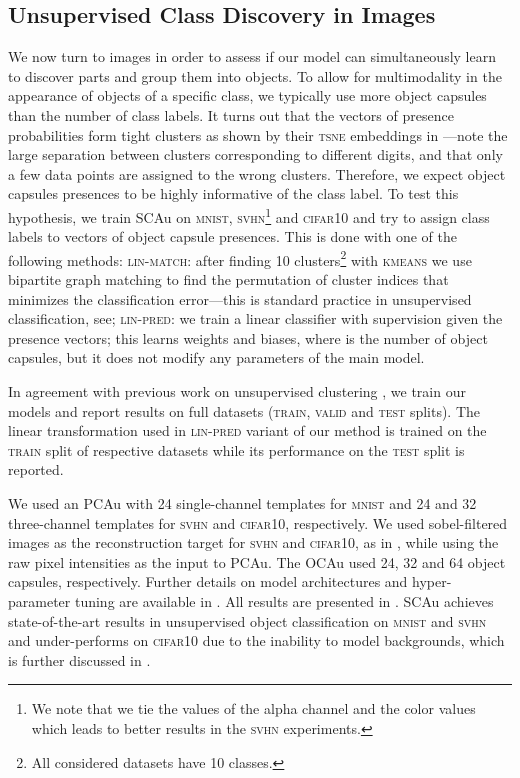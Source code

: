 \documentclass{article}
\begin{document}
\subsection{Unsupervised Class Discovery in Images}
\label{sec:cls_experiments}



We now turn to images in order to assess if our model can simultaneously learn to discover parts and group them into objects.
To allow for multimodality in the appearance of objects of a specific class, we typically use more object capsules than the number of class labels. 
It turns out that the vectors of presence probabilities form tight clusters as shown by their \textsc{tsne} embeddings \citep{Maaten2008tsne} in ---note the large separation between clusters corresponding to different digits, and that only a few data points are assigned to the wrong clusters.
Therefore, we expect object capsules presences to be highly informative of the class label.
To test this hypothesis, we train \gls{SCAu} on \textsc{mnist}, \textsc{svhn}\footnote{We note that we tie the values of the alpha channel  and the color values  which leads to better results in the \textsc{svhn} experiments.} and \textsc{cifar10} and try to assign class labels to vectors of object capsule presences.
This is done with one of the following methods: 
\textsc{lin-match}: after finding 10 clusters\footnote{All considered datasets have 10 classes.} with \textsc{kmeans} we use bipartite graph matching \citep{Kuhn1955hungarian} to find the permutation of cluster indices that minimizes the classification error---this is standard practice in unsupervised classification, see\eg \cite{Ji2018iic};
\textsc{lin-pred}: we train a linear classifier with supervision given the presence vectors; this learns  weights and  biases, where  is the number of object capsules, but it does not modify any parameters of the main model.

In agreement with previous work on unsupervised clustering \citep{Ji2018iic,Hu2017imsat,Hjelm2019deepinfomax,Haeusser2018adc}, we train our models and report results on full datasets (\textsc{train}, \textsc{valid} and \textsc{test} splits).
The linear transformation used in \textsc{lin-pred} variant of our method is trained on the \textsc{train} split of respective datasets while its performance on the \textsc{test} split is reported.

We used an \gls{PCAu} with 24 single-channel  templates for \textsc{mnist} and 24 and 32 three-channel  templates for \textsc{svhn} and \textsc{cifar10}, respectively.
We used sobel-filtered images as the reconstruction target for \textsc{svhn} and \textsc{cifar10}, as in \cite{Jaiswal2018capsule}, while using the raw pixel intensities as the input to \gls{PCAu}.
The \gls{OCAu} used 24, 32 and 64 object capsules, respectively.
Further details on model architectures and hyper-parameter tuning are available in .
All results are presented in .
\gls{SCAu} achieves state-of-the-art results in unsupervised object classification on \textsc{mnist} and \textsc{svhn} and under-performs on \textsc{cifar10} due to the inability to model backgrounds, which is further discussed in .
\end{document}
